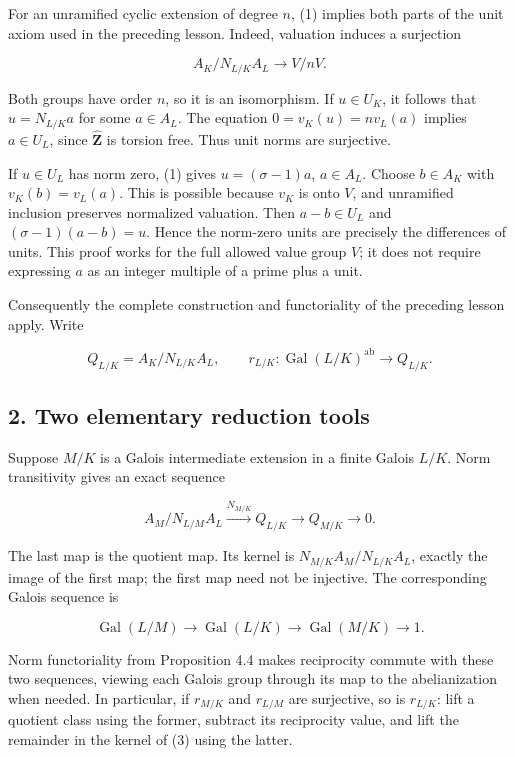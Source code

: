 \documentclass[11pt,a4paper]{article}
\begin{document}
For an unramified cyclic extension of degree \(n\), (1) implies both
parts of the unit axiom used in the preceding lesson. Indeed, valuation
induces a surjection

\[
A_K/N_{L/K}A_L\longrightarrow V/nV.
\]

Both groups have order \(n\), so it is an isomorphism. If \(u\in U_K\),
it follows that \(u=N_{L/K}a\) for some \(a\in A_L\). The equation
\(0=v_K(u)=n v_L(a)\) implies \(a\in U_L\), since
\(\widehat{\mathbf Z}\) is torsion free. Thus unit norms are surjective.

If \(u\in U_L\) has norm zero, (1) gives \(u=(\sigma-1)a\),
\(a\in A_L\). Choose \(b\in A_K\) with \(v_K(b)=v_L(a)\). This is
possible because \(v_K\) is onto \(V\), and unramified inclusion
preserves normalized valuation. Then \(a-b\in U_L\) and
\((\sigma-1)(a-b)=u\). Hence the norm-zero units are precisely the
differences of units. This proof works for the full allowed value group
\(V\); it does not require expressing \(a\) as an integer multiple of a
prime plus a unit.

Consequently the complete construction and functoriality of the
preceding lesson apply. Write

\[
Q_{L/K}=A_K/N_{L/K}A_L,\qquad
r_{L/K}:\operatorname{Gal}(L/K)^{\mathrm{ab}}\longrightarrow Q_{L/K}.
\tag{2}
\]

\subsection{2. Two elementary reduction
tools}\label{two-elementary-reduction-tools}

Suppose \(M/K\) is a Galois intermediate extension in a finite Galois
\(L/K\). Norm transitivity gives an exact sequence

\[
A_M/N_{L/M}A_L
\xrightarrow{N_{M/K}} Q_{L/K}
\longrightarrow Q_{M/K}\longrightarrow0.
\tag{3}
\]

The last map is the quotient map. Its kernel is
\(N_{M/K}A_M/N_{L/K}A_L\), exactly the image of the first map; the first
map need not be injective. The corresponding Galois sequence is

\[
\operatorname{Gal}(L/M)\longrightarrow
\operatorname{Gal}(L/K)\longrightarrow
\operatorname{Gal}(M/K)\longrightarrow1.
\tag{4}
\]

Norm functoriality from Proposition 4.4 makes reciprocity commute with
these two sequences, viewing each Galois group through its map to the
abelianization when needed. In particular, if \(r_{M/K}\) and
\(r_{L/M}\) are surjective, so is \(r_{L/K}\): lift a quotient class
using the former, subtract its reciprocity value, and lift the remainder
in the kernel of (3) using the latter.
\end{document}
